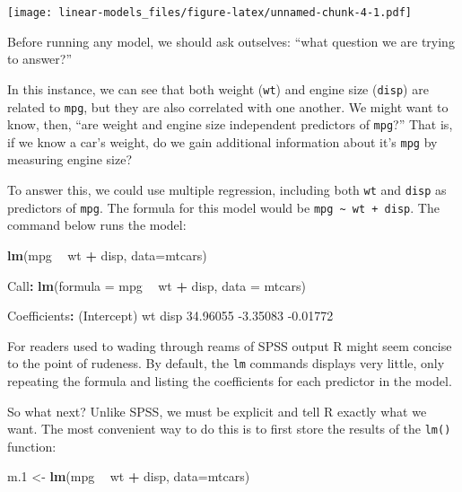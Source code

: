 \documentclass[]{article}
\newenvironment{Shaded}{\begin{snugshade}}{\end{snugshade}}
\newcommand{\DataTypeTok}[1]{\textcolor[rgb]{0.13,0.29,0.53}{#1}}
\newcommand{\FloatTok}[1]{\textcolor[rgb]{0.00,0.00,0.81}{#1}}
\newcommand{\KeywordTok}[1]{\textcolor[rgb]{0.13,0.29,0.53}{\textbf{#1}}}
\newcommand{\NormalTok}[1]{#1}
\newcommand{\OperatorTok}[1]{\textcolor[rgb]{0.81,0.36,0.00}{\textbf{#1}}}
\newcommand{\StringTok}[1]{\textcolor[rgb]{0.31,0.60,0.02}{#1}}
\begin{document}
\texttt{[image: linear-models\_files/figure-latex/unnamed-chunk-4-1.pdf]}

Before running any model, we should ask outselves: ``what question we are trying
to answer?''

In this instance, we can see that both weight (\texttt{wt}) and engine size (\texttt{disp})
are related to \texttt{mpg}, but they are also correlated with one another. We might
want to know, then, ``are weight and engine size independent predictors of
\texttt{mpg}?'' That is, if we know a car's weight, do we gain additional information
about it's \texttt{mpg} by measuring engine size?

To answer this, we could use multiple regression, including both \texttt{wt} and \texttt{disp}
as predictors of \texttt{mpg}. The formula for this model would be \texttt{mpg\ \textasciitilde{}\ wt\ +\ disp}.
The command below runs the model:

\begin{Shaded}
\begin{Highlighting}[]
\KeywordTok{lm}\NormalTok{(mpg }\OperatorTok{~}\StringTok{ }\NormalTok{wt }\OperatorTok{+}\StringTok{ }\NormalTok{disp, }\DataTypeTok{data=}\NormalTok{mtcars)}

\NormalTok{Call}\OperatorTok{:}
\KeywordTok{lm}\NormalTok{(}\DataTypeTok{formula =}\NormalTok{ mpg }\OperatorTok{~}\StringTok{ }\NormalTok{wt }\OperatorTok{+}\StringTok{ }\NormalTok{disp, }\DataTypeTok{data =}\NormalTok{ mtcars)}

\NormalTok{Coefficients}\OperatorTok{:}
\NormalTok{(Intercept)           wt         disp  }
   \FloatTok{34.96055}     \FloatTok{-3.35083}     \FloatTok{-0.01772}  
\end{Highlighting}
\end{Shaded}

For readers used to wading through reams of SPSS output R might seem concise to
the point of rudeness. By default, the \texttt{lm} commands displays very little, only
repeating the formula and listing the coefficients for each predictor in the
model.

So what next? Unlike SPSS, we must be explicit and tell R exactly what we want.
The most convenient way to do this is to first store the results of the \texttt{lm()}
function:

\begin{Shaded}
\begin{Highlighting}[]
\NormalTok{m}\FloatTok{.1}\NormalTok{ <-}\StringTok{ }\KeywordTok{lm}\NormalTok{(mpg }\OperatorTok{~}\StringTok{ }\NormalTok{wt }\OperatorTok{+}\StringTok{ }\NormalTok{disp, }\DataTypeTok{data=}\NormalTok{mtcars)}
\end{Highlighting}
\end{Shaded}
\end{document}
